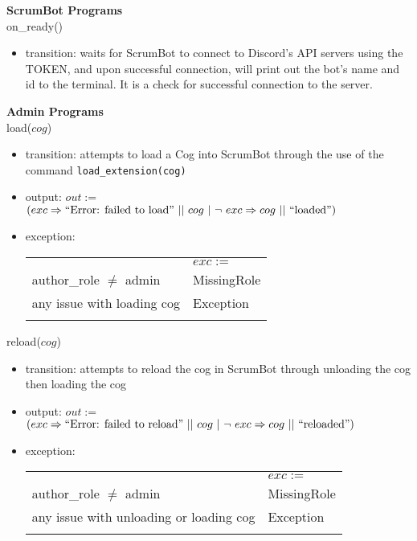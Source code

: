 \documentclass[12pt, titlepage]{article}
\begin{document}
\noindent \textbf{ScrumBot Programs\\}
\noindent on\_ready()
\begin{itemize}
    \item transition: waits for ScrumBot to connect to Discord's API servers using the TOKEN, and upon successful connection, will print out the bot's name and id to the terminal. It is a check for successful connection to the server.
\end{itemize}

\noindent \textbf{Admin Programs\\}
\noindent load($cog$)
\begin{itemize}
    \item transition: attempts to load a Cog into ScrumBot through the use of the command \texttt{load\_extension(cog)}
    
    \item output: $out :=$ $(exc \Rightarrow ``\text{Error: failed to load}"\ ||\ cog\ |\ \lnot\ exc \Rightarrow cog\ ||\ ``\text{loaded}")$
    
    \item exception:\\
    \begin{tabular}{|p{12cm}|l|}
        \hhline{~|-|}
        \multicolumn{1}{r|}{} & \multicolumn{1}{l|}{$exc :=$}\\
        \hhline{|-|-|}
        author\_role $\neq$ admin & MissingRole\\
        \hhline{|-|-|}
        any issue with loading cog & Exception\\
        \hhline{|-|-|}
    \end{tabular}
\end{itemize}

\noindent reload($cog$)
\begin{itemize}
    \item transition: attempts to reload the cog in ScrumBot through unloading the cog then loading the cog
    
    \item output: $out :=$ $(exc \Rightarrow ``\text{Error: failed to reload}"\ ||\ cog\ |\ \lnot\ exc \Rightarrow cog\ ||\ ``\text{reloaded}")$
    
    \item exception:\\
    \begin{tabular}{|p{12cm}|l|}
        \hhline{~|-|}
        \multicolumn{1}{r|}{} & \multicolumn{1}{l|}{$exc :=$}\\
        \hhline{|-|-|}
        author\_role $\neq$ admin & MissingRole\\
        \hhline{|-|-|}
        any issue with unloading or loading cog & Exception\\
        \hhline{|-|-|}
    \end{tabular}
\end{itemize}
\end{document}
